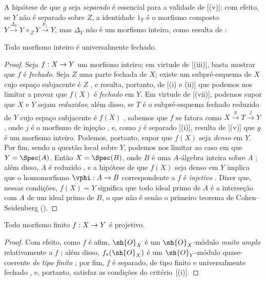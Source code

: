 \documentclass[oneside,10pt]{amsart}
\makeatletter
\newcommand{\ega@arrow}[2]{\mathchoice{#1}{#2}{#2}{#2}}
\renewcommand{\to}{\ega@arrow{\longrightarrow}{\rightarrow}}
\newcommand{\oldpage}[2][]{\marginnote{\normalfont\footnotesize\textbf{#1}~|~#2}\ignorespaces}
\let\EGAOriginalLabel\label
\renewcommand{\label}[1]{\phantomsection\EGAOriginalLabel{#1}}
\makeatother
\begin{document}
\begin{remark}[6.1.9]
\label{II.6.1.9}
A hipótese de que $g$ seja \emph{separado} é essencial para a validade de [(v)]: com efeito, se $Y$ não é separado sobre $Z$, a identidade $1_Y$ é o morfismo composto $Y\xrightarrow{\Delta_Y}Y\times_Z Y\xrightarrow{p_1}Y$, mas $\Delta_Y$ não é um morfismo inteiro, como resulta de :
\end{remark}

\begin{proposition}[6.1.10]
\label{II.6.1.10}
Todo morfismo inteiro é universalmente fechado.
\end{proposition}

\begin{proof}
Seja $f:X\to Y$ um morfismo inteiro;
em virtude de [(iii)], basta mostrar que $f$ é \emph{fechado}.
Seja $Z$ uma parte fechada de $X$;
\oldpage[II]{113}
existe um subpré-esquema de $X$ cujo espaço subjacente é $Z$ , e resulta, portanto, de [(i) e (ii)] que podemos nos limitar a provar que $f(X)$ é \emph{fechado} em $Y$.
Em virtude de [(vii)], podemos supor que $X$ e $Y$ sejam \emph{reduzidos};
além disso, se $T$ é o subpré-esquema fechado reduzido de $Y$ cujo espaço subjacente é $\overline{f(X)}$ , sabemos que $f$ se fatora como $X\xrightarrow{g}T\xrightarrow{j}Y$, onde $j$ é o morfismo de injeção , e, como $j$ é separado [(i)], resulta de [(v)] que $g$ é um morfismo inteiro.
Podemos, portanto, supor que $f(X)$ seja \emph{denso} em $Y$.
Por fim, sendo a questão local sobre $Y$, podemos nos limitar ao caso em que $Y=\Spec(A)$.
Então $X=\Spec(B)$, onde $B$ é uma $A$-álgebra inteira sobre $A$ ;
além disso, $A$ é reduzido , e a hipótese de que $f(X)$ seja denso em $Y$ implica que o homomorfismo $\vphi:A\to B$ correspondente a $f$ é \emph{injetivo} .
Dizer que, nessas condições, $f(X)=Y$ significa que todo ideal primo de $A$ é a interseção com $A$ de um ideal primo de $B$, o que não é senão o primeiro teorema de Cohen--Seidenberg (\cite[t.~I, p.~257, th.~3]{I-13}).
\end{proof}

\begin{corollary}[6.1.11]
\label{II.6.1.11}
Todo morfismo finito $f:X\to Y$ é projetivo.
\end{corollary}

\begin{proof}
Com efeito, como $f$ é afim, $\sh{O}_X$ é um $\sh{O}_X$-módulo \emph{muito amplo} relativamente a $f$ ;
além disso, $f_*(\sh{O}_X)$ é um $\sh{O}_Y$-módulo quase-coerente \emph{de tipo finito} ;
por fim, $f$ é separado, de tipo finito e universalmente fechado , e, portanto, satisfaz as condições do critério~[(i)].
\end{proof}
\end{document}
